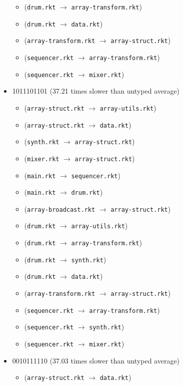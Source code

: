 \documentclass{article}
\newcommand{\mono}[1]{\texttt{#1}}
\begin{document}
\begin{itemize}
\begin{itemize}
  \item (\mono{drum.rkt} $\rightarrow$ \mono{array-transform.rkt})
  \item (\mono{drum.rkt} $\rightarrow$ \mono{data.rkt})
  \item (\mono{array-transform.rkt} $\rightarrow$ \mono{array-struct.rkt})
  \item (\mono{sequencer.rkt} $\rightarrow$ \mono{array-transform.rkt})
  \item (\mono{sequencer.rkt} $\rightarrow$ \mono{mixer.rkt})
  \end{itemize}
\item 1011101101 (37.21 times slower than untyped average)
  \begin{itemize}
  \item (\mono{array-struct.rkt} $\rightarrow$ \mono{array-utils.rkt})
  \item (\mono{array-struct.rkt} $\rightarrow$ \mono{data.rkt})
  \item (\mono{synth.rkt} $\rightarrow$ \mono{array-struct.rkt})
  \item (\mono{mixer.rkt} $\rightarrow$ \mono{array-struct.rkt})
  \item (\mono{main.rkt} $\rightarrow$ \mono{sequencer.rkt})
  \item (\mono{main.rkt} $\rightarrow$ \mono{drum.rkt})
  \item (\mono{array-broadcast.rkt} $\rightarrow$ \mono{array-struct.rkt})
  \item (\mono{drum.rkt} $\rightarrow$ \mono{array-utils.rkt})
  \item (\mono{drum.rkt} $\rightarrow$ \mono{array-transform.rkt})
  \item (\mono{drum.rkt} $\rightarrow$ \mono{synth.rkt})
  \item (\mono{drum.rkt} $\rightarrow$ \mono{data.rkt})
  \item (\mono{array-transform.rkt} $\rightarrow$ \mono{array-struct.rkt})
  \item (\mono{sequencer.rkt} $\rightarrow$ \mono{array-transform.rkt})
  \item (\mono{sequencer.rkt} $\rightarrow$ \mono{synth.rkt})
  \item (\mono{sequencer.rkt} $\rightarrow$ \mono{mixer.rkt})
  \end{itemize}
\item 0010111110 (37.03 times slower than untyped average)
  \begin{itemize}
  \item (\mono{array-struct.rkt} $\rightarrow$ \mono{data.rkt})

\end{itemize}
\end{itemize}
\end{document}
